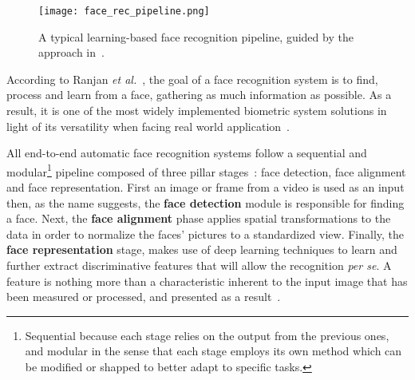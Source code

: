 \documentclass[class=report, crop=false, a4paper, 12pt]{standalone}
\begin{document}
\begin{figure}[H]
    \centering
    \texttt{[image: face\_rec\_pipeline.png]}
    \caption[Pipeline]{A typical learning-based face recognition pipeline, guided by the approach in~\autocite{wangDeepFaceRecognition2021}.}
    \label{fig:fr pipeline}
\end{figure}

\par According to Ranjan \textit{et al.}~\autocite{ranjanDeepLearningUnderstanding2018}, the goal of a face recognition system is to find, process and learn from a face, gathering as much information as possible. As a result, it is one of the most widely implemented biometric system solutions in light of its versatility when facing real world application~\autocite{duElementsEndtoendDeep2022}.

\par All end-to-end automatic face recognition systems follow a sequential and modular\footnote{Sequential because each stage relies on the output from the previous ones, and modular in the sense that each stage employs its own method which can be modified or shapped to better adapt to specific tasks.} pipeline  composed of three pillar stages~\autocite{wangDeepFaceRecognition2021}: face detection, face alignment and face representation. First an image or frame from a video is used as an input then, as the name suggests, the \textbf{face detection} module is responsible for finding a face. Next, the \textbf{face alignment} phase applies spatial transformations to the data in order to normalize the faces' pictures to a standardized view. Finally, the \textbf{face representation} stage, makes use of deep learning techniques to learn and further extract discriminative features that will allow the recognition \textit{per se}. A feature is nothing more than a characteristic inherent to the input image that has been measured or processed, and presented as a result~\autocite{Goodfellow-et-al-2016}.
\end{document}
